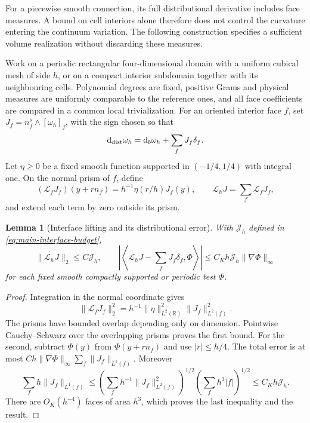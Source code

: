 \documentclass[11pt]{article}
\newtheorem{lemma}[lemma]{Lemma}
\theoremstyle{definition}
\theoremstyle{remark}
\newcommand{\R}{\mathbb R}
\newcommand{\dd}{\mathrm d}
\begin{document}
For a piecewise smooth connection, its full distributional derivative includes
face measures.  A bound on cell interiors alone therefore does not control the
curvature entering the continuum variation.  The following construction
specifies a sufficient volume realization without discarding these measures.

Work on a periodic rectangular four-dimensional domain with a uniform cubical
mesh of side $h$, or on a compact interior subdomain together with its
neighbouring cells.  Polynomial degrees are fixed, positive Grams and physical
measures are uniformly comparable to the reference ones, and all face
coefficients are compared in a common local trivialization.  For an oriented
interior face $f$, set $J_f=n_f^\flat\wedge[\omega_h]_f$, with the sign
chosen so that
\begin{equation}
 \dd_{\rm dist}\omega_h=\dd_b\omega_h+\sum_fJ_f\delta_f.
 \label{eq:supp-connection-jumps}
\end{equation}
Let $\eta\ge0$ be a fixed smooth function supported in $(-1/4,1/4)$ with
integral one.  On the normal prism of $f$, define
\begin{equation}
 (\mathcal L_fJ_f)(y+rn_f)=h^{-1}\eta(r/h)J_f(y),\qquad
 \mathcal L_hJ=\sum_f\mathcal L_fJ_f,
 \label{eq:supp-interface-lifting}
\end{equation}
and extend each term by zero outside its prism.

\begin{lemma}[Interface lifting and its distributional error]
\label{lem:supp-interface-lifting}
With $\mathcal J_h$ defined in \eqref{eq:main-interface-budget},
\begin{equation}
 \|\mathcal L_hJ\|_2\le C\mathcal J_h,\qquad
 \left|\left\langle\mathcal L_hJ-\sum_fJ_f\delta_f,\Phi\right\rangle\right|
       \le C_Kh\mathcal J_h\|\nabla\Phi\|_\infty
 \label{eq:supp-interface-lifting-bounds}
\end{equation}
for each fixed smooth compactly supported or periodic test $\Phi$.
\end{lemma}
\begin{proof}
Integration in the normal coordinate gives
\[
 \|\mathcal L_fJ_f\|_2^2
       =h^{-1}\|\eta\|_{L^2(\R)}^2\|J_f\|_{L^2(f)}^2.
\]
The prisms have bounded overlap depending only on dimension.  Pointwise
Cauchy--Schwarz over the overlapping prisms proves the first bound.
For the second, subtract $\Phi(y)$ from $\Phi(y+rn_f)$ and use
$|r|\le h/4$.  The total error is at most
$Ch\|\nabla\Phi\|_\infty\sum_f\|J_f\|_{L^1(f)}$.  Moreover
\[
 \sum_fh\|J_f\|_{L^1(f)}
 \le\left(\sum_fh^{-1}\|J_f\|_{L^2(f)}^2\right)^{1/2}
       \left(\sum_fh^3|f|\right)^{1/2}
 \le C_Kh\mathcal J_h.
\]
There are $O_K(h^{-4})$ faces of area $h^3$, which proves the last
inequality and the result.
\end{proof}
\end{document}
